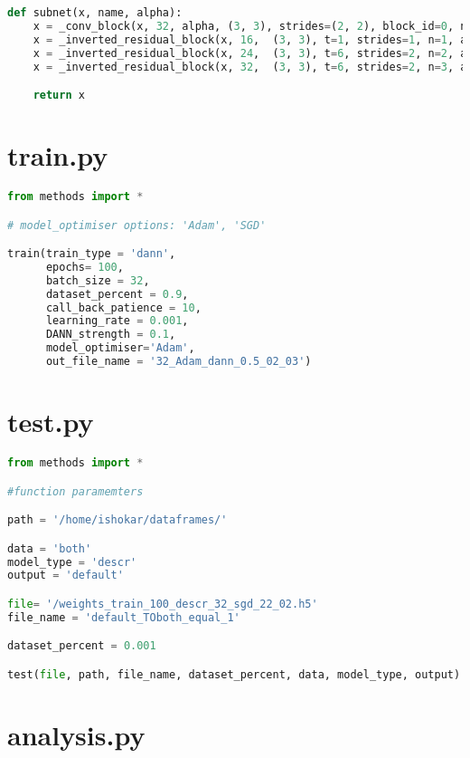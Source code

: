 \begin{lstlisting}[language=Python]
def subnet(x, name, alpha):
    x = _conv_block(x, 32, alpha, (3, 3), strides=(2, 2), block_id=0, name=name)
    x = _inverted_residual_block(x, 16,  (3, 3), t=1, strides=1, n=1, alpha=alpha, block_id=1, name=name)
    x = _inverted_residual_block(x, 24,  (3, 3), t=6, strides=2, n=2, alpha=alpha, block_id=2, name=name)
    x = _inverted_residual_block(x, 32,  (3, 3), t=6, strides=2, n=3, alpha=alpha, block_id=4, name=name)

    return x

\end{lstlisting}

\section*{train.py}

\begin{lstlisting}[language=Python]
from methods import *

# model_optimiser options: 'Adam', 'SGD'

train(train_type = 'dann',
      epochs= 100,
      batch_size = 32,
      dataset_percent = 0.9,
      call_back_patience = 10,
      learning_rate = 0.001,
      DANN_strength = 0.1,
      model_optimiser='Adam',
      out_file_name = '32_Adam_dann_0.5_02_03')

\end{lstlisting}

\section*{test.py}

\begin{lstlisting}[language=Python]
from methods import *

#function paramemters

path = '/home/ishokar/dataframes/'

data = 'both'
model_type = 'descr'
output = 'default'

file= '/weights_train_100_descr_32_sgd_22_02.h5'
file_name = 'default_TOboth_equal_1'

dataset_percent = 0.001

test(file, path, file_name, dataset_percent, data, model_type, output)

\end{lstlisting}

\section*{analysis.py}

